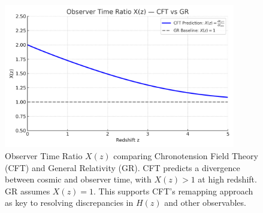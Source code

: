 
\begin{figure}[H]
    \centering
    \includegraphics[width=0.9\textwidth]{Xz_CFT_vs_GR.png}
    \caption{Observer Time Ratio $X(z)$ comparing Chronotension Field Theory (CFT) and General Relativity (GR). CFT predicts a divergence between cosmic and observer time, with $X(z) > 1$ at high redshift. GR assumes $X(z) = 1$. This supports CFT's remapping approach as key to resolving discrepancies in $H(z)$ and other observables.}
\end{figure}
